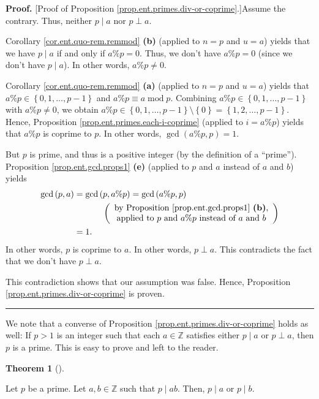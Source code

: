 \documentclass[numbers=enddot,12pt,final,onecolumn,notitlepage]{scrartcl}%
\numberwithin{exer}{subsection}
\theoremstyle{definition}
\newtheorem{theo}{Theorem}[subsection]
\newenvironment{theorem}[1][]
{\begin{theo}[#1]\begin{leftbar}}
{\end{leftbar}\end{theo}}
\newenvironment{proof}[1][Proof]{\noindent\textbf{#1.} }{\ \rule{0.5em}{0.5em}}
\begin{document}
\begin{proof}
[Proof of Proposition \ref{prop.ent.primes.div-or-coprime}.]Assume the
contrary. Thus, neither $p\mid a$ nor $p\perp a$.

Corollary \ref{cor.ent.quo-rem.remmod} \textbf{(b)} (applied to $n=p$ and
$u=a$) yields that we have $p\mid a$ if and only if $a\%p=0$. Thus, we don't
have $a\%p=0$ (since we don't have $p\mid a$). In other words, $a\%p\neq0$.

Corollary \ref{cor.ent.quo-rem.remmod} \textbf{(a)} (applied to $n=p$ and
$u=a$) yields that $a\%p\in\left\{  0,1,\ldots,p-1\right\}  $ and $a\%p\equiv
a\operatorname{mod}p$. Combining $a\%p\in\left\{  0,1,\ldots,p-1\right\}  $
with $a\%p\neq0$, we obtain $a\%p\in\left\{  0,1,\ldots,p-1\right\}
\setminus\left\{  0\right\}  =\left\{  1,2,\ldots,p-1\right\}  $. Hence,
Proposition \ref{prop.ent.primes.each-i-coprime} (applied to $i=a\%p$) yields
that $a\%p$ is coprime to $p$. In other words, $\gcd\left(  a\%p,p\right)  =1$.

But $p$ is prime, and thus is a positive integer (by the definition of a
\textquotedblleft prime\textquotedblright). Proposition
\ref{prop.ent.gcd.props1} \textbf{(e)} (applied to $p$ and $a$ instead of $a$
and $b$) yields%
\begin{align*}
\gcd\left(  p,a\right)   &  =\gcd\left(  p,a\%p\right)  =\gcd\left(
a\%p,p\right) \\
&  \ \ \ \ \ \ \ \ \ \ \left(
\begin{array}
[c]{c}%
\text{by Proposition \ref{prop.ent.gcd.props1} \textbf{(b)},}\\
\text{applied to }p\text{ and }a\%p\text{ instead of }a\text{ and }b
\end{array}
\right) \\
&  =1.
\end{align*}
In other words, $p$ is coprime to $a$. In other words, $p\perp a$. This
contradicts the fact that we don't have $p\perp a$.

This contradiction shows that our assumption was false. Hence, Proposition
\ref{prop.ent.primes.div-or-coprime} is proven.
\end{proof}

We note that a converse of Proposition \ref{prop.ent.primes.div-or-coprime}
holds as well: If $p>1$ is an integer such that each $a\in\mathbb{Z}$
satisfies either $p\mid a$ or $p\perp a$, then $p$ is a prime. This is easy to
prove and left to the reader.

\begin{theorem}
\label{thm.ent.primes.pab}Let $p$ be a prime. Let $a,b\in\mathbb{Z}$ such that
$p\mid ab$. Then, $p\mid a$ or $p\mid b$.
\end{theorem}
\end{document}
